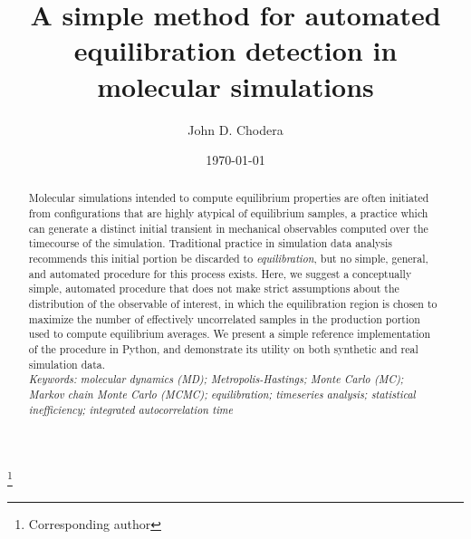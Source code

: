 \documentclass[aps,pre,twocolumn,nofootinbib,superscriptaddress,linenumbers,11point]{revtex4-1}
\begin{document}

\title{A simple method for automated equilibration detection in molecular simulations}

\author{John D. Chodera}
 \thanks{Corresponding author}

\date{\today}


\begin{abstract}

Molecular simulations intended to compute equilibrium properties are often initiated from configurations that are highly atypical of equilibrium samples, a practice which can generate a distinct initial transient in mechanical observables computed over the timecourse of the simulation.
Traditional practice in simulation data analysis recommends this initial portion be discarded to \emph{equilibration}, but no simple, general, and automated procedure for this process exists.
Here, we suggest a conceptually simple, automated procedure that does not make strict assumptions about the distribution of the observable of interest, in which the equilibration region is chosen to maximize the number of effectively uncorrelated samples in the production portion used to compute equilibrium averages.
We present a simple reference implementation of the procedure in Python, and demonstrate its utility on both synthetic and real simulation data.\\

\emph{Keywords: molecular dynamics (MD); Metropolis-Hastings; Monte Carlo (MC); Markov chain Monte Carlo (MCMC); equilibration; timeseries analysis; statistical inefficiency; integrated autocorrelation time}

\end{abstract}

\maketitle

\end{document}
